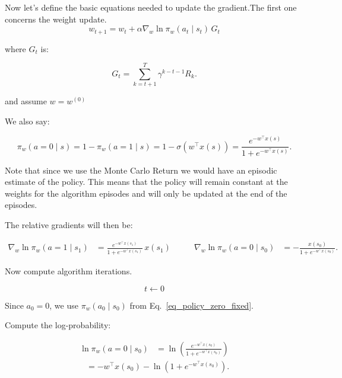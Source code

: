 \documentclass[main.tex]{subfiles}
\begin{document}
	Now let's define the basic equations needed to update the gradient.The first one concerns the weight update.
	\begin{equation}
		w_{t+1} = w_t + \alpha \nabla_w \ln \pi_w(a_t \mid s_t)\, G_t
	\end{equation}
	
	where $G_t$ is:
	
	\begin{equation}
		G_t = \sum_{k=t+1}^{T} \gamma^{k-t-1} R_k .
	\end{equation}
	
	and assume $w = w^{(0)}$
	
	We also say:
	
	\begin{equation}
		\label{eq_policy_zero_fixed}
		\pi_w(a=0 \mid s) = 1 - \pi_w(a=1 \mid s)
		= 1 - \sigma(w^\top x(s))
		= \frac{e^{-w^\top x(s)}}{1 + e^{-w^\top x(s)}} .
	\end{equation}
	
	Note that since we use the Monte Carlo Return we would have an episodic estimate of the policy. This means that the policy will remain constant at the weights for the algorithm episodes and will only be updated at the end of the episodes.
	
	The relative gradients will then be:
	
	\begin{equation}
		\begin{alignedat}{2}
			\nabla_w \ln \pi_w(a = 1 \mid s_1)
			&= \frac{e^{-w^\top x(s_1)}}{1 + e^{-w^\top x(s_1)}}\, x(s_1)
			\qquad &
			\nabla_w \ln \pi_w(a = 0 \mid s_0)
			&= -\frac{x(s_0)}{1 + e^{-w^\top x(s_0)}} .
		\end{alignedat}
	\end{equation}
	
	Now compute algorithm iterations.
	
	\begin{equation*}
		t \leftarrow 0
	\end{equation*}
	
	
	
	Since $a_0 = 0$, we use $\pi_w(a_0 \mid s_0)$ from Eq.~\eqref{eq_policy_zero_fixed}.
	
	Compute the log-probability:
	
	\begin{align}
		\ln \pi_w(a=0 \mid s_0)
		&= \ln \left( \frac{e^{-w^\top x(s_0)}}{1 + e^{-w^\top x(s_0)}} \right)
	\end{align}
	\begin{align*}	
		&= - w^\top x(s_0) - \ln(1 + e^{-w^\top x(s_0)}).
	\end{align*}
	
\end{document}
